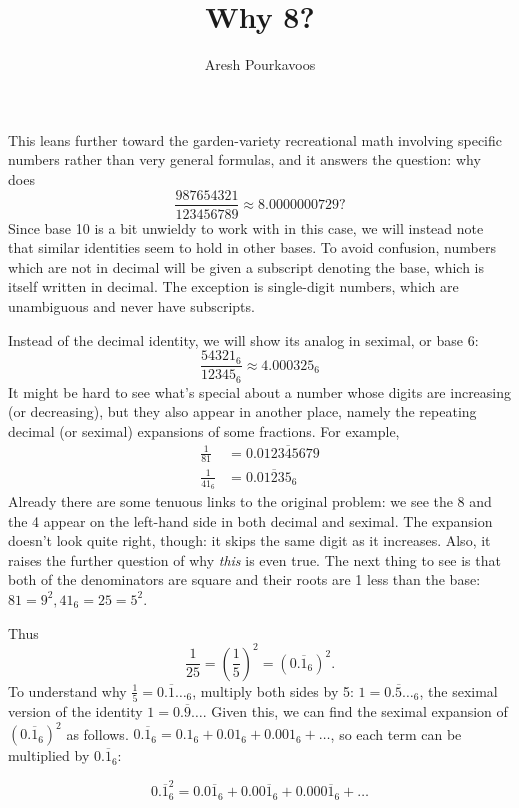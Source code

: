 \documentclass{article}
\begin{document}
\title{Why 8?}
\author{Aresh Pourkavoos}
\maketitle

This leans further toward the garden-variety recreational math
involving specific numbers rather than very general formulas,
and it answers the question: why does
\[\frac{987654321}{123456789} \approx 8.0000000729?\]
Since base 10 is a bit unwieldy to work with in this case,
we will instead note that similar identities seem to hold in other bases.
To avoid confusion, numbers which are not in decimal
will be given a subscript denoting the base,
which is itself written in decimal.
The exception is single-digit numbers, which are unambiguous
and never have subscripts.

Instead of the decimal identity,
we will show its analog in seximal, or base 6:
\[\frac{54321_6}{12345_6} \approx 4.000325_6\]
It might be hard to see what's special
about a number whose digits are increasing (or decreasing),
but they also appear in another place,
namely the repeating decimal (or seximal) expansions of some fractions.
For example,
\begin{align*}
  \frac{1}{81} &= 0.\overline{012345679} \\
  \frac{1}{41_6} &= 0.\overline{01235}_6
\end{align*}
Already there are some tenuous links to the original problem:
we see the 8 and the 4 appear on the left-hand side
in both decimal and seximal.
The expansion doesn't look quite right, though:
it skips the same digit as it increases.
Also, it raises the further question
of why \textit{this} is even true.
The next thing to see is that both of the denominators are square
and their roots are 1 less than the base:
$81=9^2, 41_6=25=5^2$.

Thus
\[\frac{1}{25}=\left(\frac{1}{5}\right)^2=(0.\overline{1}_6)^2.\]
To understand why $\frac{1}{5}=0.\overline{1}\ldots_6$,
multiply both sides by 5:
$1=0.\overline{5}\ldots_6$,
the seximal version of the identity $1=0.\overline{9}\ldots$.
Given this, we can find the seximal expansion of $(0.\overline{1}_6)^2$
as follows.
$0.\overline{1}_6=0.1_6+0.01_6+0.001_6+\ldots$,
so each term can be multiplied by $0.\overline{1}_6$:

\[0.\overline{1}_6^2 = 0.0\overline{1}_6+0.00\overline{1}_6+0.000\overline{1}_6+\ldots\]
\end{document}
